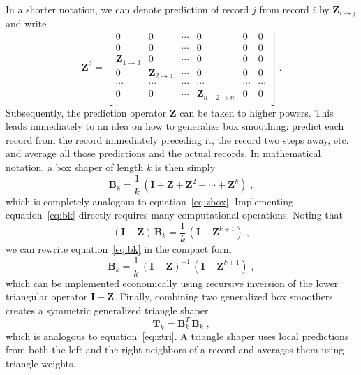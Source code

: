 In a shorter notation, we can denote prediction of record $j$ from record $i$
by $\mathbf{Z}_{i \rightarrow j}$ and write
\begin{equation}
  \label{eq:z21}
  \mathbf{Z}^2 = \left[\begin{array}{cccccc}
      0 & 0 & \cdots & 0 & 0 & 0 \\
      0 & 0 & \cdots & 0 & 0 & 0 \\
      \mathbf{Z}_{1 \rightarrow 3} & 0 & 
      \cdots & 0 & 0 & 0 \\
      0 & \mathbf{Z}_{2 \rightarrow 4} & 
      \cdots & 0 & 0 & 0 \\
      \cdots & \cdots & \cdots & \cdots & \cdots& \cdots \\
      0 & 0 & \cdots & \mathbf{Z}_{n-2 \rightarrow n} & 0 & 0 \\
    \end{array}\right]\;.
\end{equation}
Subsequently, the prediction operator $\mathbf{Z}$ can be taken to higher
powers. This leads immediately to an idea on how to generalize box smoothing:
predict each record from the record immediately preceding it, the record two
steps away, etc. and average all those predictions and the actual records. In
mathematical notation, a box shaper of length $k$ is then simply
\begin{equation}
  \label{eq:bk}
  \mathbf{B}_k = \frac{1}{k}\,\left(\mathbf{I} + \mathbf{Z} + 
    \mathbf{Z}^2 + \cdots +  \mathbf{Z}^k\right)\;,
\end{equation}
which is completely analogous to equation~\ref{eq:zbox}.
Implementing equation~\ref{eq:bk} directly requires many
computational operations. Noting that
\begin{equation}
  \label{eq:rec}
  \left(\mathbf{I} - \mathbf{Z}\right)\,\mathbf{B}_k =
    \frac{1}{k}\,\left(\mathbf{I} - \mathbf{Z}^{k+1}\right)\;,
\end{equation}
we can rewrite equation~\ref{eq:bk} in the compact form
\begin{equation}
  \label{eq:bcomp}
  \mathbf{B}_k = 
  \frac{1}{k}\,\left(\mathbf{I} - \mathbf{Z}\right)^{-1}\,
    \left(\mathbf{I} - \mathbf{Z}^{k+1}\right)\;,
\end{equation}
which can be implemented economically using recursive inversion of the lower
triangular operator $\mathbf{I} - \mathbf{Z}$.  Finally, combining two
generalized box smoothers creates a symmetric generalized triangle shaper
\begin{equation}
  \label{eq:tk}
  \mathbf{T}_k = \mathbf{B}_k^T\,\mathbf{B}_k\;,
\end{equation}
which is analogous to equation~\ref{eq:ztri}. A triangle shaper uses
local predictions from both the left and the right neighbors of a
record and averages them using triangle weights.

